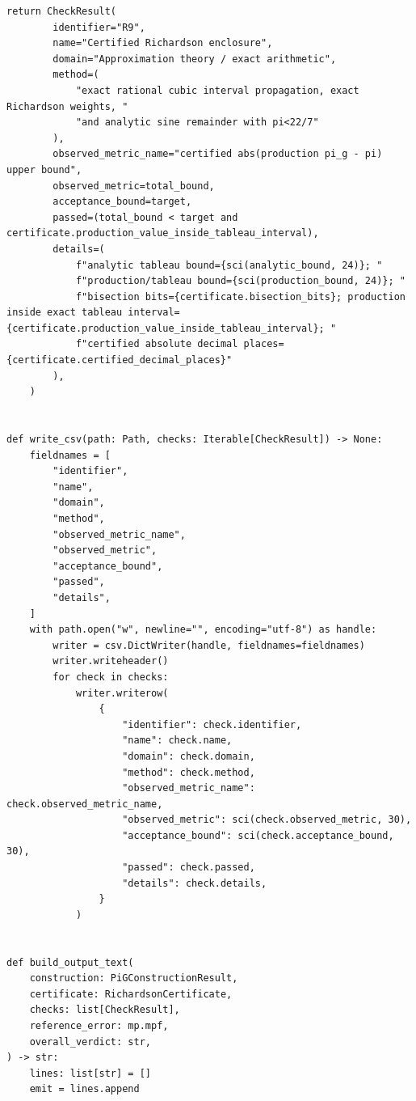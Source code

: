 \documentclass[11pt]{article}
\begin{document}
\begin{lstlisting}[style=pythonstyle,caption={Verification driver: \texttt{verify\_pi\_g\_identities.py}}]
    return CheckResult(
        identifier="R9",
        name="Certified Richardson enclosure",
        domain="Approximation theory / exact arithmetic",
        method=(
            "exact rational cubic interval propagation, exact Richardson weights, "
            "and analytic sine remainder with pi<22/7"
        ),
        observed_metric_name="certified abs(production pi_g - pi) upper bound",
        observed_metric=total_bound,
        acceptance_bound=target,
        passed=(total_bound < target and certificate.production_value_inside_tableau_interval),
        details=(
            f"analytic tableau bound={sci(analytic_bound, 24)}; "
            f"production/tableau bound={sci(production_bound, 24)}; "
            f"bisection bits={certificate.bisection_bits}; production inside exact tableau interval={certificate.production_value_inside_tableau_interval}; "
            f"certified absolute decimal places={certificate.certified_decimal_places}"
        ),
    )


def write_csv(path: Path, checks: Iterable[CheckResult]) -> None:
    fieldnames = [
        "identifier",
        "name",
        "domain",
        "method",
        "observed_metric_name",
        "observed_metric",
        "acceptance_bound",
        "passed",
        "details",
    ]
    with path.open("w", newline="", encoding="utf-8") as handle:
        writer = csv.DictWriter(handle, fieldnames=fieldnames)
        writer.writeheader()
        for check in checks:
            writer.writerow(
                {
                    "identifier": check.identifier,
                    "name": check.name,
                    "domain": check.domain,
                    "method": check.method,
                    "observed_metric_name": check.observed_metric_name,
                    "observed_metric": sci(check.observed_metric, 30),
                    "acceptance_bound": sci(check.acceptance_bound, 30),
                    "passed": check.passed,
                    "details": check.details,
                }
            )


def build_output_text(
    construction: PiGConstructionResult,
    certificate: RichardsonCertificate,
    checks: list[CheckResult],
    reference_error: mp.mpf,
    overall_verdict: str,
) -> str:
    lines: list[str] = []
    emit = lines.append


\end{lstlisting}
\end{document}
